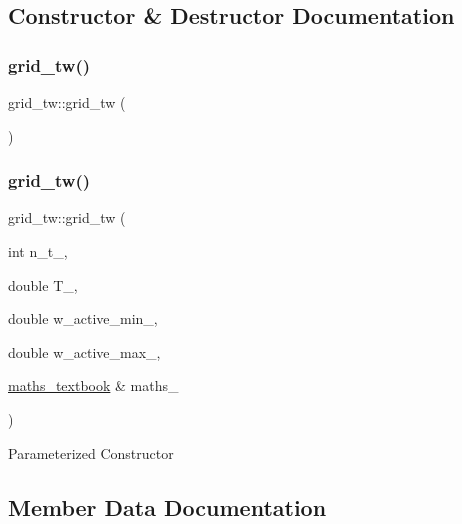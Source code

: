 \subsection{Constructor \& Destructor Documentation}
\mbox{\label{classgrid__tw_af1e2316561c84a2262e374600895010d}} 
\subsubsection{\texorpdfstring{grid\_tw()}{grid\_tw()}\hspace{0.1cm}{\footnotesize\ttfamily [1/2]}}
{\footnotesize\ttfamily grid\+\_\+tw\+::grid\+\_\+tw (\begin{DoxyParamCaption}{ }\end{DoxyParamCaption})}

\mbox{\label{classgrid__tw_a583d4c2b423305ef3806d6221ed3f543}} 
\subsubsection{\texorpdfstring{grid\_tw()}{grid\_tw()}\hspace{0.1cm}{\footnotesize\ttfamily [2/2]}}
{\footnotesize\ttfamily grid\+\_\+tw\+::grid\+\_\+tw (\begin{DoxyParamCaption}\item[{int}]{n\+\_\+t\+\_\+,  }\item[{double}]{T\+\_\+,  }\item[{double}]{w\+\_\+active\+\_\+min\+\_\+,  }\item[{double}]{w\+\_\+active\+\_\+max\+\_\+,  }\item[{\mbox{\hyperlink{classmaths__textbook}{maths\+\_\+textbook}} \&}]{maths\+\_\+ }\end{DoxyParamCaption})}

Parameterized Constructor 

\subsection{Member Data Documentation}
\mbox{\label{classgrid__tw_a1fbf854a0f7bd025aa98671009602c5c}} 
